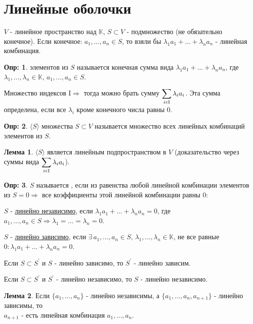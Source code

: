 \documentclass[12pt]{article}
\newcommand{\MI}{\mathrm{I}}
\theoremstyle{definition}
\newtheorem{defn}{Опр:}
\newtheorem{lemma}{Лемма}
\newcommand{\smallerrel}[1]{\mathrel{\mathpalette\smallerrelaux{#1}}}
\newcommand{\smallerrelaux}[2]{\raisebox{.1ex}{\scalebox{.75}{$#1#2$}}}
\newcommand{\smallin}{\smallerrel{\in}}
\begin{document}
\section*{Линейные оболочки}
$V$ - линейное пространство над $\mathbb{K}$, $S \subset V$ - подмножество (не обязательно конечное). Если конечное: $a_1, \dotsc, a_n \in S$, то взяли бы $\lambda_1 a_1 + \dotsc + \lambda_n a_n$ - линейная комбинация.

\begin{defn}
	 элементов из $S$ называется конечная сумма вида $\lambda_1 a_1 + \dotsc + \lambda_n a_n$, где $\lambda_1,\dotsc,\lambda_n \in \mathbb{K}, \, a_1, \dotsc, a_n \in S$.
\end{defn}

Множество индексов $\MI \Rightarrow$ тогда можно брать сумму $\displaystyle \sum\limits_{i \smallin \MI} \lambda_i a_i$. Эта сумма определена, если все $\lambda_i$ кроме конечного числа равны $0$.

\begin{defn}
	  $\langle S \rangle$ множества $S \subset V$ называется множество всех линейных комбинаций элементов из $S$.
\end{defn}

\begin{lemma}
	$\langle S \rangle$ является линейным подпространством в $V$ \bigg(доказательство через суммы вида $\displaystyle \sum\limits_{i \smallin \MI} \lambda_i a_i$\bigg).
\end{lemma}

\begin{defn}
	$S$ называется , если из равенства любой линейной комбинации элементов из $S = 0 \Rightarrow$ все коэффициенты этой линейной комбинации равны 0:
\end{defn}	
$S$ - \uline{линейно независимо}, если $\lambda_1 a_1 + \dotsc + \lambda_n a_n =0$, где $a_1, \dotsc, a_n \in S \Rightarrow \lambda_1 = \dotsc = \lambda_n = 0$.
	
$S$ - \uline{линейно зависимо}, если $\exists \, a_1, \dotsc, a_n \in S, \, \lambda_1, \dots, \lambda_n \in \mathbb{K}$, не все равные $0 \colon \lambda_1 a_1 + \dotsc + \lambda_n a_n = 0$.

Если $S \subset S^\prime$ и $S$ - линейно зависимо, то $S^\prime$ - линейно зависим.

Если $S \subset S^\prime$ и $S^\prime$ - линейно независимо, то $S$ - линейно независимо.
\begin{lemma}
	Если $\{a_1, \dotsc, a_n\}$ - линейно независимы, а $\{a_1, \dotsc, a_n, a_{n+1}\}$ - линейно зависимы, то\\ $a_{n+1}$ - есть линейная комбинация $a_1, \dotsc, a_n$.
\end{lemma}
\end{document}
